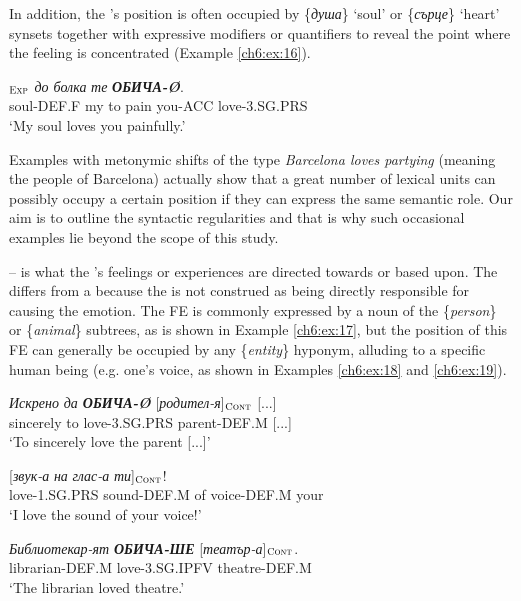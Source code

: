 \documentclass[output=paper,colorlinks,citecolor=brown]{langscibook}
\begin{document}
In addition, the 's position is often occupied by \{\textit{душа}\} `soul' or \{\textit{сърце}\} `heart'  synsets together with expressive modifiers or quantifiers to reveal the point where the feeling is concentrated (Example \ref{ch6:ex:16}). 

\begin{exe}
\ex   \label{ch6:ex:16} 
$_{\text{\textsc{Exp}}}$ {\textit{до болка}} \textit{те} \textit{\textbf{ОБИЧА-Ø}}.   \\ 
soul-DEF.F my {to pain} {you-ACC} {love-3.SG.PRS}
\\ %
\glt `My soul loves you painfully.' 
\end{exe}

Examples with metonymic shifts of the type \textit{Barcelona loves partying} (meaning the people of Barcelona) actually show that a great number of lexical units can possibly occupy a certain position if they can express the same semantic role. Our aim is to outline the syntactic regularities and that is why such occasional examples lie beyond the scope of this study. 



\textbf{} --  is what the 's feelings or experiences are directed towards or based upon. The  differs from a   because the  is not construed as being directly responsible for causing the emotion. The  FE is commonly expressed by a noun of the \{\textit{person}\} or \{\textit{animal}\} subtrees, as is shown in Example \ref{ch6:ex:17}, but the position of this FE can generally be occupied by any \{\textit{entity}\} hyponym, alluding to a specific human being (e.g. one's voice, as shown in Examples \ref{ch6:ex:18} and \ref{ch6:ex:19}). 


\begin{exe} 
\ex  \label{ch6:ex:17} 
\gll \textit{Искрено} {\textit{да \textbf{ОБИЧА-Ø}}} [\textit{родител-я}]$_{\text{\textsc{Cont}}}$   [...]  \\ 
{sincerely} {to love-3.SG.PRS} {parent-DEF.M} [...]
\\ %
\glt `To sincerely love the parent [...]'

\ex   \label{ch6:ex:18} 
 [\textit{звук-а} \textit{на} \textit{глас-а} \textit{ти}]$_{\text{\textsc{Cont}}}$!  \\ 
{love-1.SG.PRS} {sound-DEF.M} {of} {voice-DEF.M} {your}
\\ %
\glt `I love the sound of your voice!'
  
\ex   \label{ch6:ex:19} 
\gll \textit{Библиотекар-ят} {\textit{\textbf{ОБИЧА-ШЕ}}} [\textit{театър-а}]$_{\text{\textsc{Cont}}}$.  \\ 
{librarian-DEF.M} {love-3.SG.IPFV} theatre-DEF.M
\\ %
\glt `The librarian loved theatre.'
\end{exe}
\end{document}
